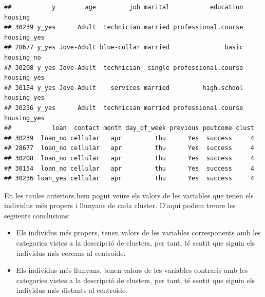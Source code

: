 \documentclass[
]{article}
\newenvironment{Shaded}{\begin{snugshade}}{\end{snugshade}}
\newcommand{\DecValTok}[1]{\textcolor[rgb]{0.00,0.00,0.81}{#1}}
\newcommand{\FunctionTok}[1]{\textcolor[rgb]{0.00,0.00,0.00}{#1}}
\newcommand{\NormalTok}[1]{#1}
\newcommand{\SpecialCharTok}[1]{\textcolor[rgb]{0.00,0.00,0.00}{#1}}
\begin{document}
\begin{Shaded}
\end{Shaded}

\begin{verbatim}
##           y        age         job marital           education     housing
## 30239 y_yes      Adult  technician married professional.course housing_yes
## 28677 y_yes Jove-Adult blue-collar married               basic  housing_no
## 30208 y_yes Jove-Adult  technician  single professional.course housing_yes
## 30154 y_yes Jove-Adult    services married         high.school housing_yes
## 30236 y_yes      Adult  technician married professional.course housing_yes
##           loan  contact month day_of_week previous poutcome clust
## 30239  loan_no cellular   apr         thu      Yes  success     4
## 28677  loan_no cellular   apr         thu      Yes  success     4
## 30208  loan_no cellular   apr         thu      Yes  success     4
## 30154  loan_no cellular   apr         thu      Yes  success     4
## 30236 loan_yes cellular   apr         thu      Yes  success     4
\end{verbatim}

En les taules anteriors hem pogut veure els valors de les variables que
tenen els individus més propers i llunyans de cada cluster. D'aquí podem
treure les següents conclusions:

\begin{itemize}
\item
  Els individus més propers, tenen valors de les variables corresponents
  amb les categories vistes a la descripció de clusters, per tant, té
  sentit que siguin els individus més cercans al centroide.
\item
  Els individus més llunyans, tenen valors de les variables contraris
  amb les categories vistes a la descripció de clusters, per tant, té
  sentit que siguin els individus més distants al centroide.
\end{itemize}
\end{document}
